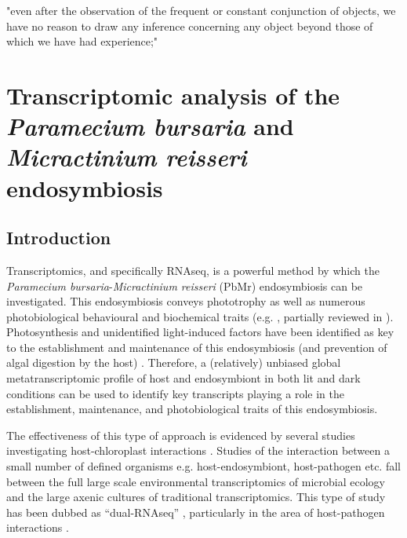 \graphicspath{{chapters/4.Chapter2/figures/}}

\begin{savequote}[75mm]
"even after the observation of the frequent or constant conjunction of objects, we have no reason to draw any inference concerning any object beyond those of which we have had experience;"
\end{savequote}


\chapter{Transcriptomic analysis of the \textit{Paramecium bursaria} and \textit{Micractinium reisseri} endosymbiosis}

\section{Introduction}

Transcriptomics, and specifically RNAseq, is a powerful method by which the \textit{Paramecium bursaria}-\textit{Micractinium reisseri} (PbMr)
endosymbiosis can be investigated. This endosymbiosis conveys phototrophy \citep{Karakashian1963} as well as 
numerous photobiological behavioural and biochemical traits (e.g. \citep{Berk1991,Saji1974,Nakajima1989,Niess1982a,Iwatsuki1988,Summerer2009}, 
partially reviewed in \citep{Sommaruga2009}).  Photosynthesis and unidentified light-induced factors have been identified as key to the establishment
and maintenance of this endosymbiosis (and prevention of algal digestion by the host) \citep{Karakashian1963,Hosoya1995a,Kodama2007,Kodama2014c}.
Therefore, a (relatively) unbiased global metatranscriptomic profile of host and endosymbiont in both lit and dark conditions can be used to 
identify key transcripts playing a role in the establishment, maintenance, and photobiological traits of this endosymbiosis. 


The effectiveness of this type of approach is evidenced by several studies investigating
host-chloroplast interactions \citep{Nowack2011,Jiggins2013,Xiang2015}. 
Studies of the interaction between a small number of defined organisms e.g. host-endosymbiont, host-pathogen etc.
fall between the full large scale environmental transcriptomics of microbial ecology \citep{Poretsky2005,AliagaGoltsman2014} 
and the large axenic cultures of traditional transcriptomics.  This type of study has been dubbed
as ``dual-RNAseq'' \citep{Westermann2012}, particularly in the area of host-pathogen interactions \citep{Tieryney2012}.


